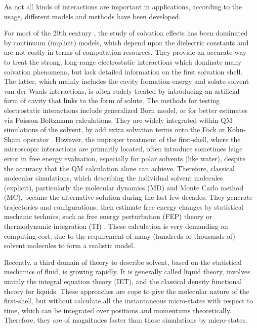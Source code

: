 As not all kinds of interactions are important in applications, according
to the usage, different models and methods have been developed.

For most of the 20th century \citep{Cramer_1999}, the study of
solvation effects has been dominated by continuum (implicit) models,
which depend upon the dielectric constants and are not costly
in terms of computation resources. They provide an accurate way to treat the
strong, long-range electrostatic interactions which dominate many
solvation phenomena, but lack detailed information on the first
solvation shell. The latter, which mainly includes the cavity formation
energy and solute-solvent van der Waals interactions, is often rudely
treated by introducing an artificial form of cavity that links to the
form of solute. The methods for testing electrostatic interactions include
generalized Born model, or for better estimates via Poisson-Boltzmann
calculations. They are widely integrated within \acs{QM} simulations
of the solvent, by add extra solvation terms onto the Fock or Kohn-Sham
operator \citep{Jensen,scrf,Tomasi_1994_implicit_model}. However,
the improper treatment of the first-shell, where the microscopic interactions
are primarily located, often introduce sometimes huge error in free
energy evaluation, especially for polar solvents (like water), despite
the accuracy that the \acs{QM} calculation alone can achieve. Therefore,
classical molecular simulations, which describing the individual solvent
molecules (explicit), particularly the molecular dynamics (\acs{MD})
and Monte Carlo method (\acs{MC}), became the alternative solution
during the last few decades. They generate trajectories and configurations,
then estimate free energy changes by statistical mechanic technics,
such as free energy perturbation (FEP) theory or thermodynamic integration
(TI) \citep{Jorgensen_1995_MC}. These calculation is very demanding
on computing cost, due to the requirement of many (hundreds or thousands
of) solvent molecules to form a realistic model.

Recently, a third domain of theory to describe solvent, based on the
statistical mechanics of fluid, is growing rapidly. It is generally
called liquid theory, involves mainly the integral equation theory
(\acs{IET}), and the classical density functional theory for liquids.
These approaches are cope to give the molecular nature of the first-shell,
but without calculate all the instantaneous micro-states with respect
to time, which can be integrated over positions and momentums theoretically.
Therefore, they are of magnitudes faster than those simulations by
micro-states.

